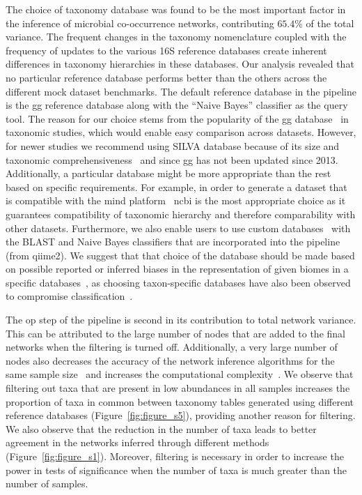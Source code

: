   The choice of taxonomy database was found to be the most important factor in the inference of microbial co-occurrence networks, contributing $65.4\%$ of the total variance.
  The frequent changes in the taxonomy nomenclature coupled with the frequency of updates to the various 16S reference databases create inherent differences \cite{Balvociute2017} in taxonomy hierarchies in these databases.
  Our analysis revealed that no particular reference database performs better than the others across the different mock dataset benchmarks.
  The default reference database in the pipeline is the \ac{gg} reference database along with the ``Naive Bayes'' classifier as the query tool.
  The reason for our choice stems from the popularity of the \ac{gg} database~\cite{parkEvaluation16SRRNA2018} in taxonomic studies, which would enable easy comparison across datasets.
  However, for newer studies we recommend using SILVA database because of its size and taxonomic comprehensiveness~\cite{iiRESCRIPtReproducibleSequence2021} and since \ac{gg} has not been updated since 2013.
  Additionally, a particular database might be more appropriate than the rest based on specific requirements.
  For example, in order to generate a dataset that is compatible with the \ac{mind} platform~\cite{huResourceComparisonIntegration2022} \ac{ncbi} is the most appropriate choice as it guarantees compatibility of taxonomic hierarchy and therefore comparability with other datasets.
  Furthermore, we also enable users to use custom databases~\cite{Ritari2015,iiRESCRIPtReproducibleSequence2021} with the BLAST and Naive Bayes classifiers that are incorporated into the pipeline (from \ac{qiime2}).
  We suggest that that choice of the database should be made based on possible reported or inferred biases in the representation of given biomes in a specific databases~\cite{Balvociute2017,iiRESCRIPtReproducibleSequence2021}, as choosing taxon-specific databases have also been observed to compromise classification~\cite{rmarcelinoUseTaxonspecificReference2020}.

  The \ac{op} step of the pipeline is second in its contribution to total network variance.
  This can be attributed to the large number of nodes that are added to the final networks when the filtering is turned off.
  Additionally, a very large number of nodes also decreases the accuracy of the network inference algorithms for the same sample size~\cite{peschelNetCoMiNetworkConstruction2020} and increases the computational complexity~\cite{tackmannRapidInferenceDirect2019}.
  We observe that filtering out taxa that are present in low abundances in all samples increases the proportion of taxa in common between taxonomy tables generated using different reference databases (Figure~\ref{fig:figure_s5}), providing another reason for filtering.
  We also observe that the reduction in the number of taxa leads to better agreement in the networks inferred through different methods (Figure~\ref{fig:figure_s1}).
  Moreover, filtering is necessary in order to increase the power in tests of significance when the number of taxa is much greater than the number of samples.
